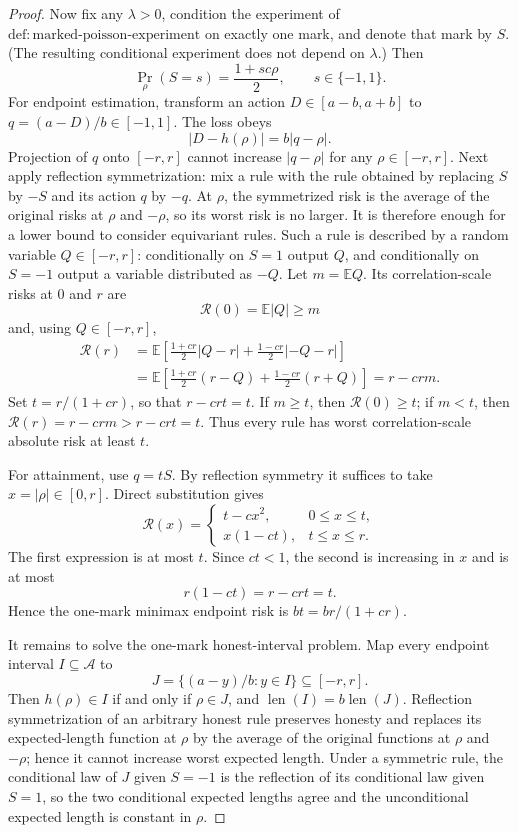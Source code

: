 \documentclass{article}
\begin{document}
\begin{proof}
Now fix any \(\lambda>0\), condition the experiment of \(\mathrm{def{:}marked\mbox{-}poisson\mbox{-}experiment}\) on exactly one mark, and denote that mark by \(S\).  (The resulting conditional experiment does not depend on \(\lambda\).)  Then
\[
 \Pr_\rho(S=s)=\frac{1+sc\rho}{2},\qquad s\in\{-1,1\}.
\]
For endpoint estimation, transform an action \(D\in[a-b,a+b]\) to \(q=(a-D)/b\in[-1,1]\).  The loss obeys
\[
 |D-h(\rho)|=b|q-\rho|.
\]
Projection of \(q\) onto \([-r,r]\) cannot increase \(|q-\rho|\) for any \(\rho\in[-r,r]\).  Next apply reflection symmetrization: mix a rule with the rule obtained by replacing \(S\) by \(-S\) and its action \(q\) by \(-q\).  At \(\rho\), the symmetrized risk is the average of the original risks at \(\rho\) and \(-\rho\), so its worst risk is no larger.  It is therefore enough for a lower bound to consider equivariant rules.  Such a rule is described by a random variable \(Q\in[-r,r]\): conditionally on \(S=1\) output \(Q\), and conditionally on \(S=-1\) output a variable distributed as \(-Q\).  Let \(m=\mathbb E Q\).  Its correlation-scale risks at \(0\) and \(r\) are
\[
 \mathcal R(0)=\mathbb E|Q|\geq m
\]
and, using \(Q\in[-r,r]\),
\[
 \begin{aligned}
 \mathcal R(r)
 &=\mathbb E\left[\frac{1+cr}{2}|Q-r|+\frac{1-cr}{2}|-Q-r|\right]\\
 &=\mathbb E\left[\frac{1+cr}{2}(r-Q)+\frac{1-cr}{2}(r+Q)\right]
 =r-crm.
 \end{aligned}
\]
Set \(t=r/(1+cr)\), so that \(r-crt=t\).  If \(m\geq t\), then \(\mathcal R(0)\geq t\); if \(m<t\), then \(\mathcal R(r)=r-crm>r-crt=t\).  Thus every rule has worst correlation-scale absolute risk at least \(t\).

For attainment, use \(q=tS\).  By reflection symmetry it suffices to take \(x=|\rho|\in[0,r]\).  Direct substitution gives
\[
 \mathcal R(x)=
 \begin{cases}
 t-cx^2,&0\leq x\leq t,\\
 x(1-ct),&t\leq x\leq r.
 \end{cases}
\]
The first expression is at most \(t\).  Since \(ct<1\), the second is increasing in \(x\) and is at most
\[
 r(1-ct)=r-crt=t.
\]
Hence the one-mark minimax endpoint risk is \(bt=br/(1+cr)\).

It remains to solve the one-mark honest-interval problem.  Map every endpoint interval \(I\subseteq\mathcal A\) to
\[
 J=\{(a-y)/b:y\in I\}\subseteq[-r,r].
\]
Then \(h(\rho)\in I\) if and only if \(\rho\in J\), and \(\operatorname{len}(I)=b\operatorname{len}(J)\).  Reflection symmetrization of an arbitrary honest rule preserves honesty and replaces its expected-length function at \(\rho\) by the average of the original functions at \(\rho\) and \(-\rho\); hence it cannot increase worst expected length.  Under a symmetric rule, the conditional law of \(J\) given \(S=-1\) is the reflection of its conditional law given \(S=1\), so the two conditional expected lengths agree and the unconditional expected length is constant in \(\rho\).


\end{proof}
\end{document}
